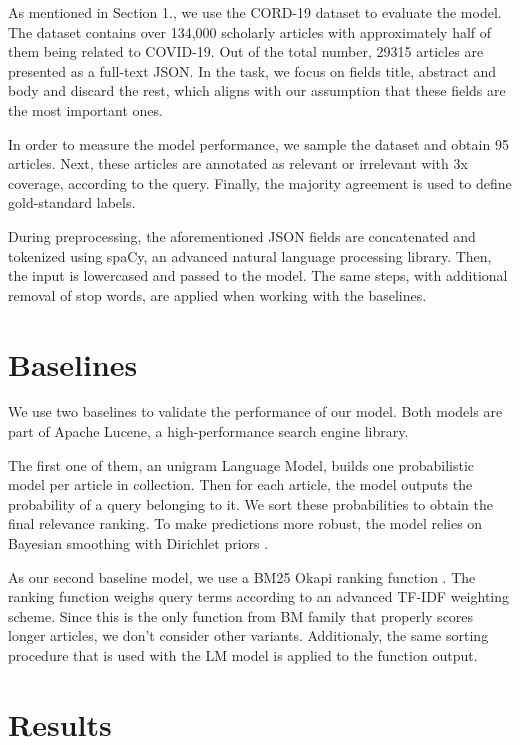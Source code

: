 \documentclass[10pt, a4paper]{article}
\begin{document}
As mentioned in Section 1., we use the CORD-19 dataset to evaluate the model. The dataset contains over 134,000 scholarly articles with approximately half of them being related to COVID-19. Out of the total number, 29315 articles are presented as a full-text JSON. In the task, we focus on fields title, abstract and body and discard the rest, which aligns with our assumption that these fields are the most important ones.

In order to measure the model performance, we sample the dataset and obtain 95 articles. Next, these articles are annotated as relevant or irrelevant with 3x coverage, according to the query. Finally, the majority agreement is used to define gold-standard labels.  

During preprocessing, the aforementioned JSON fields are concatenated and tokenized using spaCy, an advanced natural language processing library. Then, the input is lowercased and passed to the model. The same steps, with additional removal of stop words, are applied when working with the baselines.

\section{Baselines}

We use two baselines to validate the performance of our model. Both models are part of Apache Lucene, a high-performance search engine library.

The first one of them, an unigram Language Model, builds one probabilistic model per article in collection. Then for each article, the model outputs the probability of a query belonging to it. We sort these probabilities to obtain the final relevance ranking. To make predictions more robust, the model relies on Bayesian smoothing with Dirichlet priors \citep{zhai2004study}.

As our second baseline model, we use a BM25 Okapi ranking function \citep{robertson1995okapi}. The ranking function weighs query terms according to an advanced TF-IDF weighting scheme. Since this is the only function from BM family that properly scores longer articles, we don't consider other variants. Additionaly, the same sorting procedure that is used with the LM model is applied to the function output. 

\section{Results}
\end{document}

